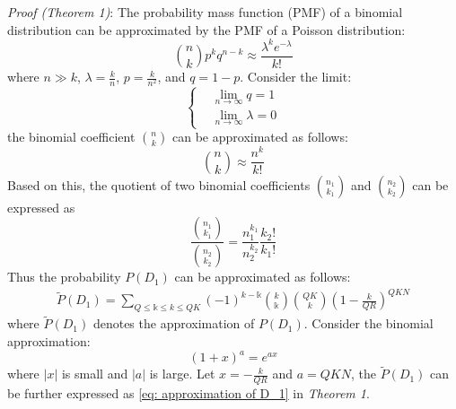 \documentclass[a4paper]{IEEEtran}
\begin{document}
\textit{Proof (Theorem 1)}: The probability mass function (PMF) of a binomial distribution can be approximated by the PMF of a Poisson distribution:
\begin{equation}
{n \choose k} p^k q^{n-k} \approx \frac{\lambda^{k} e^{-\lambda}}{k!}
\end{equation}
where $n\gg k$, $\lambda = \frac{k}{n}$, $p = \frac{k}{n^2}$, and $q = 1 - p$. Consider the limit: 
\begin{equation}
\left\{
\begin{split}
&\lim_{n\to\infty} q = 1\\
&\lim_{n\to\infty} \lambda = 0
\end{split}
\right.
\end{equation}
the binomial coefficient ${n \choose k}$ can be approximated as follows: 
\begin{equation}
{n \choose k} \approx \frac{n^{k}}{k!}
\end{equation}
Based on this, the quotient of two binomial coefficients ${n_1 \choose k_1}$ and ${n_2 \choose k_2}$ can be expressed as
\begin{equation}
\frac{{n_1 \choose k_1}}{{n_2 \choose k_2}} = \frac{n_1^{k_1}}{n_2^{k_2}}\frac{k_2!}{k_1!}
\end{equation}
Thus the probability $P(D_1)$ can be approximated as follows:
\begin{equation}
\begin{split}
\widetilde{P}(D_1) = \sum_{Q\leq \mathbb{k} \leq k \leq QK}(-1)^{k-\mathbb{k}} {k \choose \mathbb{k}} {QK \choose k} \left( 1- \frac{{k}}{{QR}} \right)^{QKN}
\end{split}
\end{equation}
where $\widetilde{P}(D_1)$ denotes the approximation of $P({D_1})$. Consider the binomial approximation: 
\begin{equation}
(1+{x})^a = e^{ax}
\end{equation}
where $|x|$ is small and $|a|$ is large. Let $x = -\frac{k}{QR}$ and $a = QKN$, the $\widetilde{P}(D_1)$ can be further expressed as \eqref{eq: approximation of D_1} in \textit{Theorem 1}.
\end{document}
